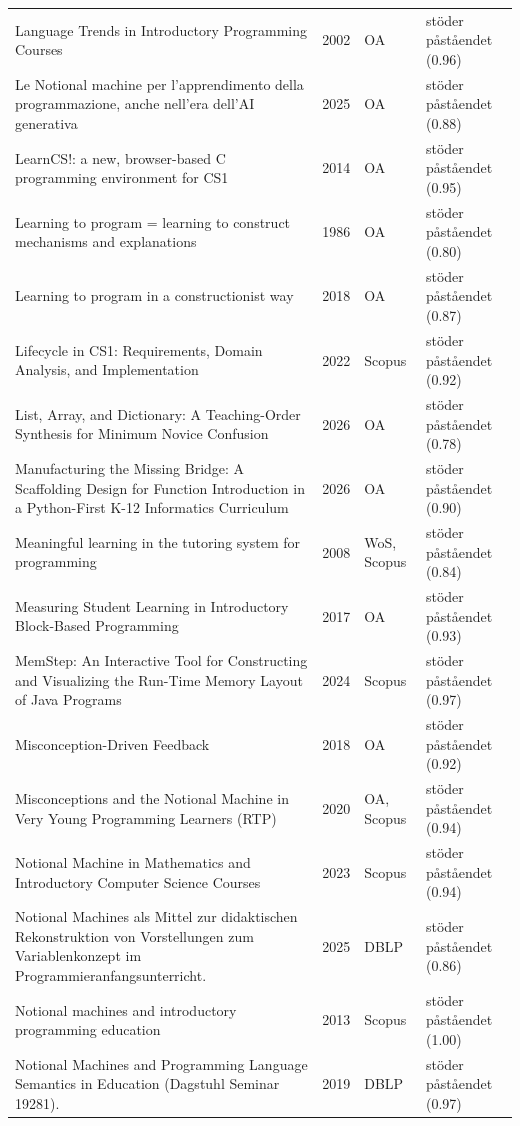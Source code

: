 \begin{longtable}{@{}%
  >{\raggedright\arraybackslash}p{}c%
  >{\raggedright\arraybackslash}p{}%
  >{\raggedright\arraybackslash}p{}@{}}
Language Trends in Introductory Programming Courses & 2002 & OA & stöder påståendet (0.96) \\
Le Notional machine per l'apprendimento della programmazione, anche nell'era dell'AI generativa & 2025 & OA & stöder påståendet (0.88) \\
LearnCS!: a new, browser-based C programming environment for CS1 & 2014 & OA & stöder påståendet (0.95) \\
Learning to program = learning to construct mechanisms and explanations & 1986 & OA & stöder påståendet (0.80) \\
Learning to program in a constructionist way & 2018 & OA & stöder påståendet (0.87) \\
Lifecycle in CS1: Requirements, Domain Analysis, and Implementation & 2022 & Scopus & stöder påståendet (0.92) \\
List, Array, and Dictionary: A Teaching-Order Synthesis for Minimum Novice Confusion & 2026 & OA & stöder påståendet (0.78) \\
Manufacturing the Missing Bridge: A Scaffolding Design for Function Introduction in a Python-First K-12 Informatics Curriculum & 2026 & OA & stöder påståendet (0.90) \\
Meaningful learning in the tutoring system for programming & 2008 & WoS, Scopus & stöder påståendet (0.84) \\
Measuring Student Learning in Introductory Block-Based Programming & 2017 & OA & stöder påståendet (0.93) \\
MemStep: An Interactive Tool for Constructing and Visualizing the Run-Time Memory Layout of Java Programs & 2024 & Scopus & stöder påståendet (0.97) \\
Misconception-Driven Feedback & 2018 & OA & stöder påståendet (0.92) \\
Misconceptions and the Notional Machine in Very Young Programming Learners (RTP) & 2020 & OA, Scopus & stöder påståendet (0.94) \\
Notional Machine in Mathematics and Introductory Computer Science Courses & 2023 & Scopus & stöder påståendet (0.94) \\
Notional Machines als Mittel zur didaktischen Rekonstruktion von Vorstellungen zum Variablenkonzept im Programmieranfangsunterricht. & 2025 & DBLP & stöder påståendet (0.86) \\
Notional machines and introductory programming education & 2013 & Scopus & stöder påståendet (1.00) \\
Notional Machines and Programming Language Semantics in Education (Dagstuhl Seminar 19281). & 2019 & DBLP & stöder påståendet (0.97) \\

\end{longtable}
